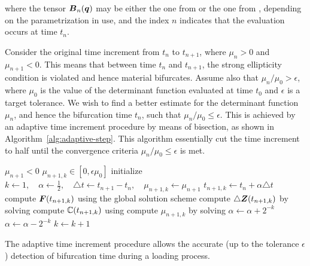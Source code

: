\documentclass[12pt]{article}
\numberwithin{equation}{section}
\begin{document}
where the tensor ${\boldsymbol{B}}_n({\boldsymbol{q}})$ may be either the one from
 or the one from
, depending on the parametrization
in use, and the index $n$ indicates that the evaluation occurs at time
$t_n$. 

Consider the original time increment from $t_n$ to $t_{n+1}$, where 
$\mu_n > 0$ and $\mu_{n+1} < 0$. This means that between time $t_n$ 
and $t_{n+1}$, the strong ellipticity condition is violated and hence 
material bifurcates. Assume also that $\mu_n / \mu_0 > \epsilon$, 
where $\mu_0$ is the value of the determinant function evaluated at 
time $t_0$ and $\epsilon$ is a target tolerance. We wish to find a 
better estimate for the determinant function $\mu_n$, and hence the 
bifurcation time $t_n$, such that $\mu_n / \mu_0 \le \epsilon$. This 
is achieved by an adaptive time increment procedure by means of 
bisection, as shown in Algorithm~\ref{alg:adaptive-step}. This 
algorithm essentially cut the time increment to half until the 
convergence criteria $\mu_n / \mu_0 \le \epsilon$ is met.

\begin{algorithm}
  \caption{$\text{AdaptiveStep}(\mu_0, \mu_{n+1}, t_{n+1}, \epsilon)$}
  \begin{algorithmic}
    \REQUIRE $\mu_{n+1} < 0$
    \ENSURE $\mu_{n+1,k} \in [0, \epsilon \mu_0]$
    \STATE initialize
    $k \leftarrow 1,
    \quad
    \alpha \leftarrow \frac{1}{2},
    \quad
    \triangle t \leftarrow t_{n+1} - t_n,
    \quad
    \mu_{n+1,k} \leftarrow \mu_{n+1}$
    \STATE $t_{n+1,k} \leftarrow t_n + \alpha \triangle t$
    \STATE compute ${\boldsymbol{F}}(t_{n+1,k})$ using the global solution scheme
    \STATE compute $\triangle {\boldsymbol{Z}}(t_{n+1,k})$
    by solving 
    \STATE compute $\mathbb{C}(t_{n+1,k})$
    using 
    \STATE compute $\mu_{n+1,k}$
    by solving 
    \STATE $\alpha \leftarrow \alpha + 2^{-k}$
    \ELSE
    \STATE $\alpha \leftarrow \alpha - 2^{-k}$
    \ENDIF
    \STATE $k \leftarrow k+1$
    \ENDWHILE
  \end{algorithmic}
  \label{alg:adaptive-step}
\end{algorithm}

The adaptive time increment procedure allows the accurate (up to the
tolerance $\epsilon$) detection of bifurcation time during a loading
process.
\end{document}
